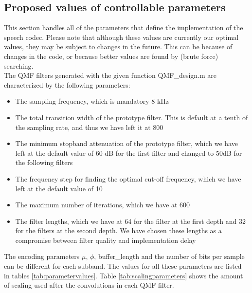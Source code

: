 \documentclass[a4paper]{article}
\begin{document}
\subsection{Proposed values of controllable parameters}
This section handles all of the parameters that define the implementation of the speech codec. Please note that although these values are currently our optimal values, they may be subject to changes in the future. This can be because of changes in the code, or because better values are found by (brute force) searching.\\

The QMF filters generated with the given function QMF\_design.m are characterized by the following parameters:

\begin{itemize}
\item The sampling frequency, which is mandatory 8 kHz
\item The total transition width of the prototype filter. This is default at a tenth of the sampling rate, and thus we have left it at 800
\item The minimum stopband attenuation of the prototype filter, which we have left at the default value of 60 dB for the first filter and changed to 50dB for the following filters
\item The frequency step for finding the optimal cut-off frequency, which we have left at the default value of 10
\item The maximum number of iterations, which we have at 600
\item The filter lengths, which we have at 64 for the filter at the first depth and 32 for the filters at the second depth. We have chosen these lengths as a compromise between filter quality and implementation delay
\
\end{itemize}

The encoding parameters $\mu$, $\phi$, buffer\_length and the number of bits per sample can be different for each subband. The values for all these parameters are listed in tables \ref{tab:parametervalues}. Table \ref{tab:scalingparameters} shows the amount of scaling used after the convolutions in each QMF filter.
\end{document}
